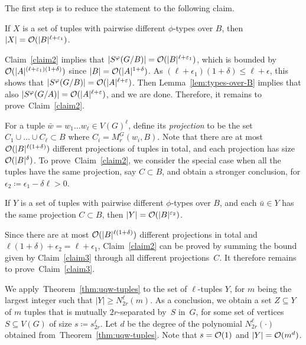 \setcounter{claim}{0}
	
The first step is to reduce the statement to the following claim.

\begin{claim}\label{claim2}
  If $X$ is a set of tuples with pairwise different $\phi$-types over
  $B$, then $|X|=\mathcal{O}(|B|^{\ell+\varepsilon_1})$.
\end{claim}	

Claim~\ref{claim2} implies that
$|S^\varphi(G/B)|=\mathcal{O}(|B|^{\ell+\varepsilon_1})$, which is bounded by
$\mathcal{O}(|A|^{(\ell+\varepsilon_1)(1+\delta)})$ since
$|B|=\mathcal{O}(|A|^{1+\delta})$. As
$(\ell+\epsilon_1)(1+\delta)\le \ell+\epsilon$, this shows that
$|S^\varphi(G/B)|=\mathcal{O}(|A|^{\ell+\varepsilon})$.  Then
Lemma~\ref{lem:types-over-B} implies that also
$|S^\varphi(G/A)|=\mathcal{O}(|A|^{\ell+\varepsilon})$, and we are done. Therefore,
it remains to prove~Claim~\ref{claim2}.

\medskip

For a tuple $\bar w=w_1\ldots w_\ell\in V(G)^\ell$, define its
\emph{projection} to be the set $C_1\cup\ldots\cup C_\ell\subset B$
where $C_i=M^G_r(w_i, B)$. Note that there are at most
$\mathcal{O}(|B|^{\ell(1+\delta)})$ different projections of tuples in total,
and each projection has size $\mathcal{O}(|B|^\delta)$.  To
prove~Claim~\ref{claim2}, we consider the special case when all the
tuples have the same projection, say $C\subset B$, and obtain a
stronger conclusion, for
$\epsilon_2\coloneqq \epsilon_1-\delta\ell>0$.

\begin{claim}\label{claim3}
  If $Y$ is a set of tuples with pairwise different $\phi$-types over
  $B$, and each $\bar u\in Y$ has the same projection $C\subset B$,
  then $|Y|=\mathcal{O}(|B|^{\varepsilon_2})$.
\end{claim}

Since there are at most $\mathcal{O}(|B|^{\ell(1+\delta)})$ different
projections in total and $\ell(1+\delta)+\epsilon_2=\ell+\epsilon_1$,
Claim~\ref{claim2} can be proved by summing the bound given by
Claim~\ref{claim3} through all different projections~$C$.  It
therefore remains to prove~Claim~\ref{claim3}.

\medskip

We apply~Theorem~\ref{thm:uqw-tuples} to the set of $\ell$-tuples $Y$,
for $m$ being the largest integer such that
\mbox{$|Y|\ge N^{\ell}_{2r}(m)$}.  As a conclusion, we obtain a set
$Z\subseteq Y$ of $m$ tuples that is mutually $2r$-separated by~$S$
in~$G$, for some set of vertices $S\subseteq V(G)$ of size
$s\coloneqq s^{\ell}_{2r}$.  Let $d$ be the degree of the polynomial
$N^\ell_{2r}(\cdot)$ obtained from~Theorem~\ref{thm:uqw-tuples}.  Note
that $s=\mathcal{O}(1)$ and $|Y|=\mathcal{O}(m^d)$.
    
